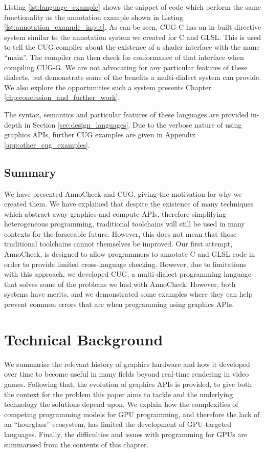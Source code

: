\documentclass[a4paper,12pt,twoside,openright]{report}
\begin{document}
Listing \ref{lst:language_example} shows the snippet of code which perform the
same functionality as the annotation example shown in Listing
\ref{lst:annotation_example_input}. As can be seen, CUG-C has an in-built
directive system similar to the annotation system we created for C and GLSL.
This is used to tell the CUG compiler about the existence of a shader interface
with the name ``main''. The compiler can then check for conformance of that
interface when compiling CUG-G. We are not advocating for any particular
features of these dialects, but demonstrate some of the benefits a
multi-dialect system can provide. We also explore the opportunities such a
system presents Chapter \ref{chp:conclusion_and_further_work}.

The syntax, semantics and particular features of these languages are provided
in-depth in Section \ref{sec:design_languages}. Due to the verbose nature of
using graphics APIs, further CUG examples are given in Appendix
\ref{app:other_cug_examples}.

\section{Summary}

We have presented AnnoCheck and CUG, giving the motivation for why we created
them. We have explained that despite the existence of many techniques which
abstract-away graphics and compute APIs, therefore simplifying heterogeneous
programming, traditional toolchains will still be used in many contexts for the
forseeable future. However, this does not mean that those traditional
toolchains cannot themselves be improved. Our first attempt, AnnoCheck, is
designed to allow programmers to annotate C and GLSL code in order to provide
limited cross-language checking. However, due to limitations with this
approach, we developed CUG, a multi-dialect programming language that solves
some of the problems we had with AnnoCheck. However, both systems have merits,
and we demonstrated some examples where they can help prevent common errors
that are when programming using graphics APIs.

\chapter{Technical Background}

\label{chp:technical_background}

We summarise the relevant history of graphics hardware and how it developed
over time to become useful in many fields beyond real-time rendering in video
games. Following that, the evolution of graphics APIs is provided, to give both
the context for the problem this paper aims to tackle and the underlying
technology the solutions depend upon. We explain how the complexities of
competing programming models for GPU programming, and therefore the lack of an
``hourglass'' ecosystem, has limited the development of GPU-targeted languages.
Finally, the difficulties and issues with programming for GPUs are summarised
from the contents of this chapter.
\end{document}
